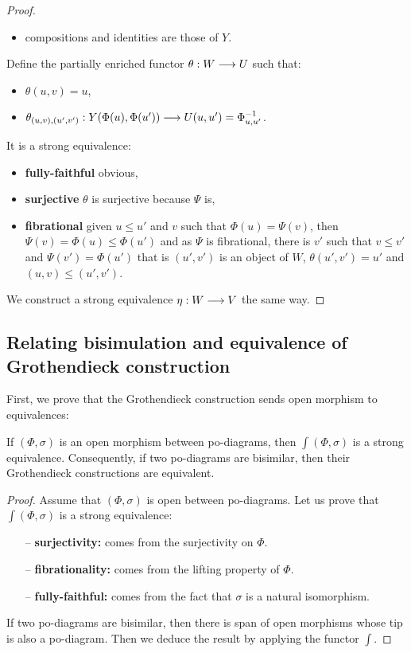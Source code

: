 \begin{proof}
\begin{itemize}
	\item compositions and identities are those of $Y$.
\end{itemize}
Define the partially enriched functor $\theta : W \longrightarrow U$ such that:
\begin{itemize}
	\item $\theta(u,v) = u$,
	\item $\theta_{(u,v),(u',v')} : Y(\Phi(u),\Phi(u')) \longrightarrow U(u,u') = \Phi_{u,u'}^{-1}$.
\end{itemize}
It is a strong equivalence:
\begin{itemize}
	\item \textbf{fully-faithful} obvious,
	\item \textbf{surjective} $\theta$ is surjective because $\Psi$ is,
	\item \textbf{fibrational} given $u \leq u'$ and $v$ such that $\Phi(u) = \Psi(v)$, then $\Psi(v) = \Phi(u) \leq \Phi(u')$ and as $\Psi$ is fibrational, there is $v'$ such that $v \leq v'$ and $\Psi(v') = \Phi(u')$ that is $(u',v')$ is an object of $W$, $\theta(u',v') = u'$ and $(u,v) \leq (u',v')$.
\end{itemize}
We construct a strong equivalence $\eta : W \longrightarrow V$ the same way.
\end{proof}

	\subsection{Relating bisimulation and equivalence of Grothendieck construction}
	
	First, we prove that the Grothendieck construction sends open morphism to equivalences:
	
	\begin{prop}
	If $(\Phi,\sigma)$ is an open morphism between po-diagrams, then $\int (\Phi,\sigma)$ is a strong equivalence. Consequently, if two po-diagrams are bisimilar, then their Grothendieck constructions are equivalent.
	\end{prop}
	
	\begin{proof}
	Assume that $(\Phi,\sigma)$ is open between po-diagrams. Let us prove that $\int(\Phi,\sigma)$ is a strong equivalence:
		\begin{itemize}
			\item[--] \textbf{surjectivity:} comes from the surjectivity on $\Phi$.
			\item[--] \textbf{fibrationality:} comes from the lifting property of $\Phi$.
			\item[--] \textbf{fully-faithful:} comes from the fact that $\sigma$ is a natural isomorphism.
		\end{itemize}
	If two po-diagrams are bisimilar, then there is span of open morphisms whose tip is also a po-diagram. Then we deduce the result by applying the functor $\int$.
	\end{proof}
	
